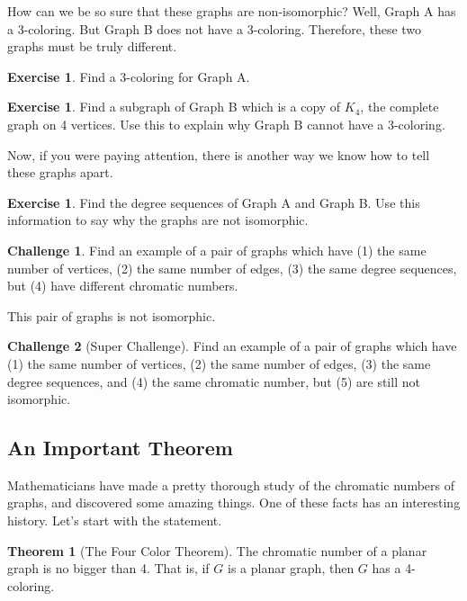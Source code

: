 \documentclass[12pt,letterpaper]{article}
\theoremstyle{definition}
\newtheorem{exercise}[question]{Exercise}
\newtheorem*{challenge}{Challenge}
\newtheorem*{theorem}{Theorem}
\begin{document}
How can we be so sure that these graphs are non-isomorphic? Well, Graph A has a 3-coloring. But Graph B does not have a 3-coloring. Therefore, these two graphs must be truly different.

\begin{exercise}
Find a 3-coloring for Graph A.
\end{exercise}

\begin{exercise}
Find a subgraph of Graph B which is a copy of $K_4$, the complete graph on 4 vertices. Use this to explain why 
Graph B cannot have a 3-coloring.
\end{exercise}

Now, if you were paying attention, there is another way we know how to tell these graphs apart. 

\begin{exercise}
Find the degree sequences of Graph A and Graph B. Use this information to say why the graphs are not isomorphic.
\end{exercise}

\begin{challenge}
Find an example of a pair of graphs which have (1) the same number of vertices, (2) the same number of edges, 
(3) the same degree sequences, but (4) have different chromatic numbers. 

This pair of graphs is not isomorphic.
\end{challenge}

\begin{challenge}[Super Challenge] 
Find an example of a pair of graphs which have (1) the same number of vertices, (2) the same number of edges, 
(3) the same degree sequences, and (4) the same chromatic number, but (5) are still not isomorphic.
\end{challenge}


\clearpage
\subsection*{An Important Theorem}

Mathematicians have made a pretty thorough study of the chromatic numbers of graphs, and discovered some amazing things. One of these facts has an interesting history. Let's start with the statement.

\begin{theorem}[The Four Color Theorem] 
The chromatic number of a planar graph is no bigger than 4. That is, if $G$ is a planar graph, then $G$ has a
4-coloring.
\end{theorem}
\end{document}
